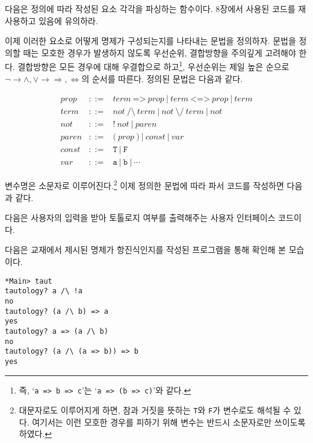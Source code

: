 다음은 정의에 따라 작성된 요소 각각을 파싱하는 함수이다. 8장에서 사용된 코드를
재사용하고 있음에 유의하라.

이제 이러한 요소로 어떻게 명제가 구성되는지를 나타내는 문법을 정의하자. 문법을
정의할 때는 모호한 경우가 발생하지 않도록 우선순위, 결합방향을 주의깊게
고려해야 한다. 결합방향은 모든 경우에 대해 우결합으로 하고\footnote{즉,
  `\texttt{a => b => c}'는 `\texttt{a => (b => c)}'와 같다.}, 우선순위는 제일
높은 순으로 $\neg \rightarrow \wedge, \vee \rightarrow \Rightarrow,
\Leftrightarrow$의 순서를 따른다. 정의된 문법은 다음과 같다.

\[\begin{array}{lcl}
   prop & ::= & term ~\texttt{=>}~ prop ~|~ term ~\texttt{<=>}~ prop ~|~ term \\
   term & ::= & not ~\texttt{/\textbackslash} ~term ~|~ not ~\texttt{\textbackslash/} ~term ~|~ not \\
    not & ::= & \texttt{!} ~not ~|~ paren \\
  paren & ::= & \texttt{(} ~prop~ \texttt{)} ~|~ const ~|~ var \\
  const & ::= & \texttt{T} ~|~ \texttt{F} \\
    var & ::= & \texttt{a} ~|~ \texttt{b} ~|~ \cdots
\end{array}\]

변수명은 소문자로 이루어진다.\footnote{대문자로도 이루어지게 하면, 참과 거짓을
  뜻하는 \texttt{T}와 \texttt{F}가 변수로도 해석될 수 있다. 여기서는 이런
  모호한 경우를 피하기 위해 변수는 반드시 소문자로만 쓰이도록 하였다.} 이제
정의한 문법에 따라 파서 코드를 작성하면 다음과 같다.


다음은 사용자의 입력을 받아 토톨로지 여부를 출력해주는 사용자 인터페이스
코드이다.


다음은 교재에서 제시된 명제가 항진식인지를 작성된 프로그램을 통해 확인해 본
모습이다.

\begin{lstlisting}
*Main> taut
tautology? a /\ !a
no
tautology? (a /\ b) => a
yes
tautology? a => (a /\ b)
no
tautology? (a /\ (a => b)) => b
yes
\end{lstlisting}




      